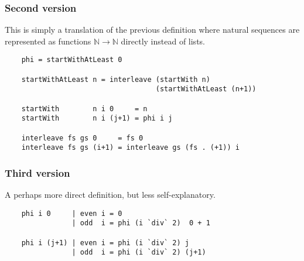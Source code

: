 \documentclass[envcountsame]{llncs}
\newcommand{\N}{\mathbb{N}}
\begin{document}
\subsubsection{Second version} This is simply a translation of the previous definition where natural sequences are represented as functions $\N\to\N$ directly instead of lists.\begin{verbatim}
    phi = startWithAtLeast 0

    startWithAtLeast n = interleave (startWith n)
                                    (startWithAtLeast (n+1))

    startWith        n i 0     = n
    startWith        n i (j+1) = phi i j

    interleave fs gs 0     = fs 0
    interleave fs gs (i+1) = interleave gs (fs . (+1)) i
\end{verbatim}

\subsubsection{Third version} A perhaps more direct definition, but less self-explanatory.
\begin{verbatim}
    phi i 0     | even i = 0
                | odd  i = phi (i `div` 2)  0 + 1

    phi i (j+1) | even i = phi (i `div` 2) j
                | odd  i = phi (i `div` 2) (j+1)
\end{verbatim}
\end{document}
